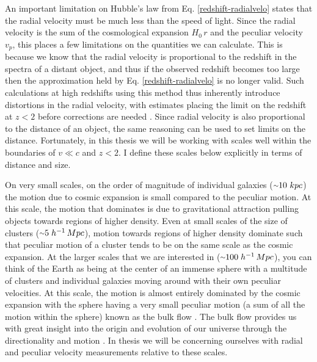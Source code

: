An important limitation on Hubble's law from Eq. \ref{redshift-radialvelo} states that the radial velocity must be much less than the speed of light. Since the radial velocity is the sum of the cosmological expansion $H_0\, r$ and the peculiar velocity $v_p$, this places a few limitations on the quantities we can calculate. This is because we know that the radial velocity is proportional to the redshift in the spectra of a distant object, and thus if the observed redshift becomes too large then the approximation held by Eq. \ref{redshift-radialvelo} is no longer valid. Such calculations at high redshifts using this method thus inherently introduce distortions in the radial velocity, with estimates placing the limit on the redshift at $z < 2$ before corrections are needed \cite{Kaiser2015:PerturbLumDist+PecVelo}. Since radial velocity is also proportional to the distance of an object, the same reasoning can be used to set limits on the distance. Fortunately, in this thesis we will be working with scales well within the boundaries of $v \ll c$ and $z < 2$. I define these scales below explicitly in terms of distance and size.



On very small scales, on the order of magnitude of individual galaxies ($\mytilde 10\ kpc$) the motion due to cosmic expansion is small compared to the peculiar motion. At this scale, the motion that dominates is due to gravitational attraction pulling objects towards regions of higher density. Even at small scales of the size of clusters ($\mytilde 5\; h^{-1}\, Mpc$), motion towards regions of higher density dominate such that peculiar motion of a cluster tends to be on the same scale as the cosmic expansion. At the larger scales that we are interested in ($\mytilde 100\; h^{-1}\, Mpc$), you can think of the Earth as being at the center of an immense sphere with a multitude of clusters and individual galaxies moving around with their own peculiar velocities. At this scale, the motion is almost entirely dominated by the cosmic expansion with the sphere having a very small peculiar motion (a sum of all the motion within the sphere) known as the bulk flow \cite{Feldman2008}\cite{Watkins2015:BulkFlow+CF2}. The bulk flow provides us with great insight into the origin and evolution of our universe through the directionality and motion \cite{Watkins2007}\cite{Watkins2009:LCDM+Challenge}\cite{Macaulay21092012}. In thesis we will be concerning ourselves with radial and peculiar velocity measurements relative to these scales.

